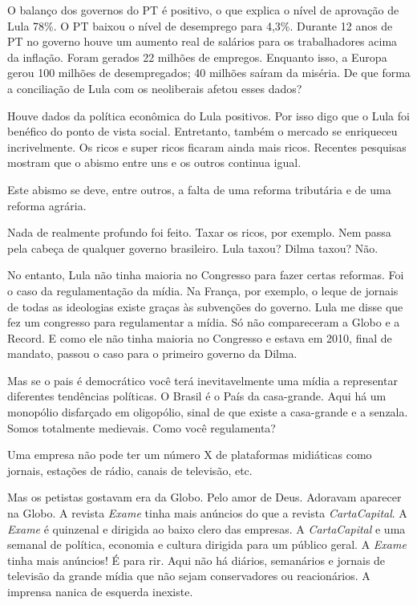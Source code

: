  O balanço dos governos do PT é positivo, o que explica o nível de
aprovação de Lula 78\%. O PT baixou o nível de desemprego para 4,3\%.
Durante 12 anos de PT no governo houve um aumento real de salários para
os trabalhadores acima da inflação. Foram gerados 22 milhões de
empregos. Enquanto isso, a Europa gerou 100 milhões de desempregados; 40
milhões saíram da miséria. De que forma a conciliação de Lula com os
neoliberais afetou esses dados?

 Houve dados da política econômica do Lula positivos. Por isso digo
que o Lula foi benéfico do ponto de vista social. Entretanto, também o
mercado se enriqueceu incrivelmente. Os ricos e super ricos ficaram
ainda mais ricos. Recentes pesquisas mostram que o abismo entre uns e os
outros continua igual.

 Este abismo se deve, entre outros, a falta de uma reforma tributária
e de uma reforma agrária.

 Nada de realmente profundo foi feito. Taxar os ricos, por exemplo.
Nem passa pela cabeça de qualquer governo brasileiro. Lula taxou? Dilma
taxou? Não.

 No entanto, Lula não tinha maioria no Congresso para fazer certas
reformas. Foi o caso da regulamentação da mídia. Na França, por exemplo,
o leque de jornais de todas as ideologias existe graças às subvenções do
governo. Lula me disse que fez um congresso para regulamentar a mídia.
Só não compareceram a Globo e a Record. E como ele não tinha maioria no
Congresso e estava em 2010, final de mandato, passou o caso para o
primeiro governo da Dilma.

 Mas se o pais é democrático você terá inevitavelmente uma mídia a
representar diferentes tendências políticas. O Brasil é o País da
casa-grande. Aqui há um monopólio disfarçado em oligopólio, sinal de que
existe a casa-grande e a senzala. Somos totalmente medievais. Como você
regulamenta?

 Uma empresa não pode ter um número X de plataformas midiáticas como
jornais, estações de rádio, canais de televisão, etc.

 Mas os petistas gostavam era da Globo. Pelo amor de Deus. Adoravam
aparecer na Globo. A revista \emph{Exame} tinha mais anúncios do que a
revista \emph{CartaCapital}. A \emph{Exame} é quinzenal e dirigida ao
baixo clero das empresas. A \emph{CartaCapital} e uma semanal de
política, economia e cultura dirigida para um público geral. A
\emph{Exame} tinha mais anúncios! É para rir. Aqui não há diários,
semanários e jornais de televisão da grande mídia que não sejam
conservadores ou reacionários. A imprensa nanica de esquerda inexiste.

